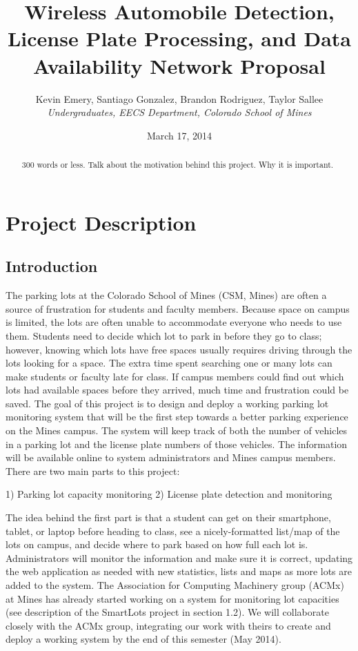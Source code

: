 \documentclass[11pt, oneside, fullpage, doublespace]{article}
\title{Wireless Automobile Detection, License Plate Processing, and Data Availability Network Proposal}
\author{Kevin Emery, Santiago Gonzalez, Brandon Rodriguez, Taylor Sallee\\ \emph{Undergraduates, EECS Department, Colorado School of Mines}}
\date{March 17, 2014}
\begin{document}
\maketitle

\begin{abstract}
300 words or less. Talk about the motivation behind this project. Why it is important.
\end{abstract}

\section{Project Description}

\subsection{Introduction}

The parking lots at the Colorado School of Mines (CSM, Mines) are often a source of frustration for students and faculty members. Because space on campus is limited, the lots are often unable to accommodate everyone who needs to use them. Students need to decide which lot to park in before they go to class; however, knowing which lots have free spaces usually requires driving through the lots looking for a space. The extra time spent searching one or many lots can make students or faculty late for class. If campus members could find out which lots had available spaces before they arrived, much time and frustration could be saved. The goal of this project is to design and deploy a working parking lot monitoring system that will be the first step towards a better parking experience on the Mines campus. The system will keep track of both the number of vehicles in a parking lot and the license plate numbers of those vehicles. The information will be available online to system administrators and Mines campus members. There are two main parts to this project:

1) Parking lot capacity monitoring
2) License plate detection and monitoring

The idea behind the first part is that a student can get on their smartphone, tablet, or laptop before heading to class, see a nicely-formatted list/map of the lots on campus, and decide where to park based on how full each lot is. Administrators will monitor the information and make sure it is correct, updating the web application as needed with new statistics, lists and maps as more lots are added to the system. The Association for Computing Machinery group (ACMx) at Mines has already started working on a system for monitoring lot capacities (see description of the SmartLots project in section 1.2). We will collaborate closely with the ACMx group, integrating our work with theirs to create and deploy a working system by the end of this semester (May 2014).
\end{document}

